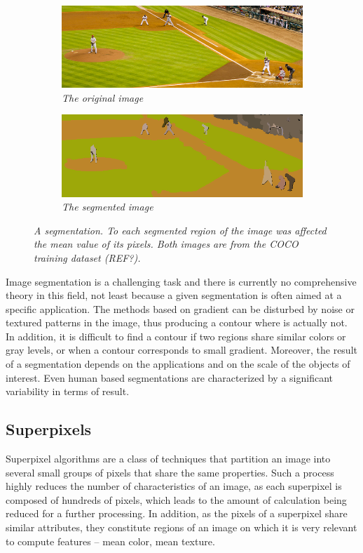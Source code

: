 \documentclass{article}
\begin{document}
        \begin{figure}[!ht]
        \centering
        \begin{subfigure}{.49\linewidth}
            \centering
            \includegraphics[width=0.9\linewidth]{pics/img_segm1.jpg}
            \caption{\textit{The original image}}
        \end{subfigure}
        \begin{subfigure}{.49\linewidth}
            \centering
            \includegraphics[width=0.9\linewidth]{pics/img_segm2.png}
            \caption{\textit{The segmented image}}
        \end{subfigure}
            \caption{\textit{A segmentation. To each segmented region of the image was affected the mean value of its pixels. Both images are from the COCO training dataset (REF?).}}
            \label{fig:segm}
        \end{figure}

        Image segmentation is a challenging task and there is currently no comprehensive theory in this field, not least because a given segmentation is often aimed at a specific application. The methods based on gradient can be disturbed by noise or textured patterns in the image, thus producing a contour where is actually not. In addition, it is difficult to find a contour if two regions share similar colors or gray levels, or when a contour corresponds to small gradient. Moreover, the result of a segmentation depends on the applications and on the scale of the objects of interest. Even human based segmentations are characterized by a significant variability in terms of result.

    \subsection{Superpixels}
        Superpixel algorithms are a class of techniques that partition an image into several small groups of pixels that share the same properties. Such a process highly reduces the number of characteristics of an image, as each superpixel is composed of hundreds of pixels, which leads to the amount of calculation being reduced for a further processing. In addition, as the pixels of a superpixel share similar attributes, they constitute regions of an image on which it is very relevant to compute features -- mean color, mean texture.
\end{document}
